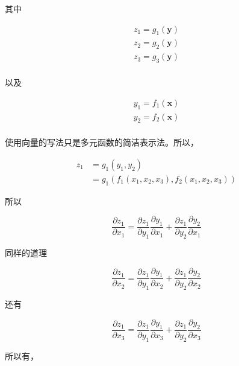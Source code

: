 \documentclass[lang=cn,newtx,10pt,scheme=chinese]{elegantbook}
\begin{document}
其中

\begin{equation*}
\begin{matrix}
z_1 = g_1(\mathbf{y}) \\
z_2 = g_2(\mathbf{y}) \\
z_3 = g_3(\mathbf{y}) \\
\end{matrix}
\end{equation*}

以及

\begin{equation*}
\begin{matrix}
y_1 = f_1(\mathbf{x}) \\
y_2 = f_2(\mathbf{x}) \\
\end{matrix}
\end{equation*}

使用向量的写法只是多元函数的简洁表示法。所以，

\begin{equation*}
\begin{aligned}
z_1 &= g_1(y_1, y_2) \\
    &= g_1(f_1(x_1, x_2, x_3), f_2(x_1, x_2, x_3))
\end{aligned}
\end{equation*}

所以

\begin{equation*}
\frac{\partial z_1}{\partial x_1} = \frac{\partial z_1}{\partial y_1}\frac{\partial y_1}{\partial x_1}+\frac{\partial z_1}{\partial y_2}\frac{\partial y_2}{\partial x_1}
\end{equation*}

同样的道理

\begin{equation*}
\frac{\partial z_1}{\partial x_2} = \frac{\partial z_1}{\partial y_1}\frac{\partial y_1}{\partial x_2}+\frac{\partial z_1}{\partial y_2}\frac{\partial y_2}{\partial x_2}
\end{equation*}

还有

\begin{equation*}
\frac{\partial z_1}{\partial x_3} = \frac{\partial z_1}{\partial y_1}\frac{\partial y_1}{\partial x_3}+\frac{\partial z_1}{\partial y_2}\frac{\partial y_2}{\partial x_3}
\end{equation*}

所以有，
\end{document}

